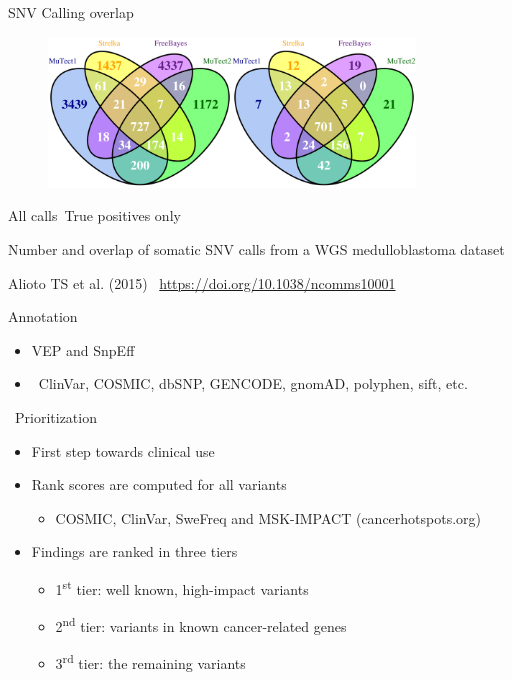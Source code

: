 \documentclass[usepdftitle=false]{beamer}
\newcommand{\ts}{\textsuperscript}
\begin{document}
\begin{frame}{SNV Calling overlap}
	\begin{figure}
		\includegraphics[height=4cm]{pictures/Sarek_venn_Calls.png}
	\end{figure}
		\vspace{-.5cm}
		\begin{center}
			\small{All calls\hspace{2cm}\ True positives only}
		\end{center}

		\small{Number and overlap of somatic SNV calls from a WGS medulloblastoma dataset}

	\small{Alioto TS et al. (2015) \aiDoi\ \url{https://doi.org/10.1038/ncomms10001}}
\end{frame}

\begin{frame}{Annotation}
	\begin{itemize}
		\item VEP and SnpEff
		\pause
		\item \faDatabase\ ClinVar, COSMIC, dbSNP, GENCODE, gnomAD, polyphen, sift, etc.
	\end{itemize}
\end{frame}

\begin{frame}{\faWrench\ Prioritization}
	\begin{itemize}
		\item	First step towards clinical use
		\pause
		\item	Rank scores are computed for all variants
		\begin{itemize}
			\item	COSMIC, ClinVar, SweFreq and MSK-IMPACT (cancerhotspots.org)
		\end{itemize}
		\pause
		\item	Findings are ranked in three tiers
		\pause
		\begin{itemize}
			\item	1\ts{st} tier: well known, high-impact variants
			\item	2\ts{nd} tier: variants in known cancer-related genes
			\item	3\ts{rd} tier: the remaining variants
		\end{itemize}
	\end{itemize}
\end{frame}
\end{document}
